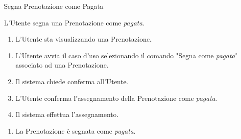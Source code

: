 {\ucExtTable	%
{	%
	Segna Prenotazione come Pagata
	
}{	%
	
}{	%
	L'Utente segna una Prenotazione come \emph{pagata}.
	
}{	%
	\attori
	
}{	%
	\begin{enumerate}
        \item L'Utente sta visualizzando una Prenotazione.
    \end{enumerate}
	
}{	%
	\begin{enumerate}
        \item L'Utente avvia il caso d'uso selezionando il comando "Segna come \emph{pagata}" associato ad una Prenotazione.
        \item Il sistema chiede conferma all'Utente. %
        \item L'Utente conferma l'assegnamento della Prenotazione come \emph{pagata}.
        \item Il sistema effettua l'assegnamento.
    \end{enumerate}
	
}{	%
	\begin{enumerate}
        \item La Prenotazione è segnata come \emph{pagata}.
    \end{enumerate}
	
} }